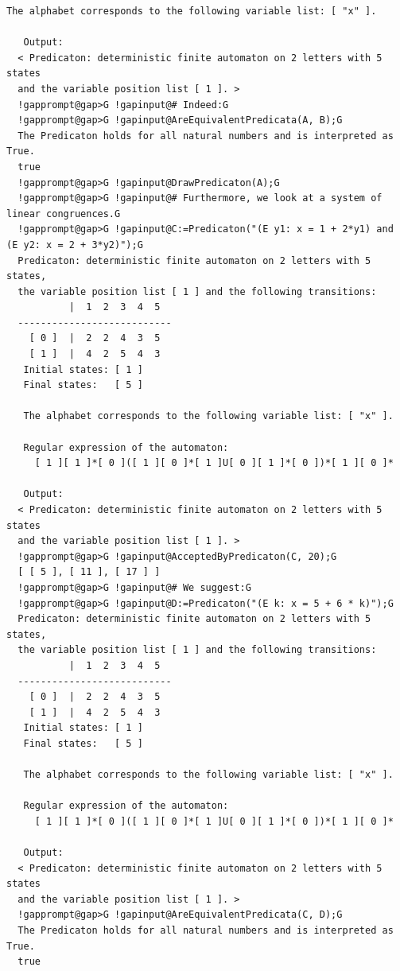 \documentclass[a4paper,11pt]{report}
\begin{document}
{{{\begin{Verbatim}[commandchars=!@G,fontsize=\small,frame=single,label=Example]
   The alphabet corresponds to the following variable list: [ "x" ].
  
   Output:
  < Predicaton: deterministic finite automaton on 2 letters with 5 states 
  and the variable position list [ 1 ]. >
  !gapprompt@gap>G !gapinput@# Indeed:G
  !gapprompt@gap>G !gapinput@AreEquivalentPredicata(A, B);G
  The Predicaton holds for all natural numbers and is interpreted as True.
  true
  !gapprompt@gap>G !gapinput@DrawPredicaton(A);G
  !gapprompt@gap>G !gapinput@# Furthermore, we look at a system of linear congruences.G
  !gapprompt@gap>G !gapinput@C:=Predicaton("(E y1: x = 1 + 2*y1) and (E y2: x = 2 + 3*y2)");G
  Predicaton: deterministic finite automaton on 2 letters with 5 states, 
  the variable position list [ 1 ] and the following transitions:
           |  1  2  3  4  5  
  ---------------------------
    [ 0 ]  |  2  2  4  3  5  
    [ 1 ]  |  4  2  5  4  3  
   Initial states: [ 1 ]
   Final states:   [ 5 ]
  
   The alphabet corresponds to the following variable list: [ "x" ].
  
   Regular expression of the automaton:
     [ 1 ][ 1 ]*[ 0 ]([ 1 ][ 0 ]*[ 1 ]U[ 0 ][ 1 ]*[ 0 ])*[ 1 ][ 0 ]*
  
   Output:
  < Predicaton: deterministic finite automaton on 2 letters with 5 states 
  and the variable position list [ 1 ]. >
  !gapprompt@gap>G !gapinput@AcceptedByPredicaton(C, 20);G
  [ [ 5 ], [ 11 ], [ 17 ] ]
  !gapprompt@gap>G !gapinput@# We suggest:G
  !gapprompt@gap>G !gapinput@D:=Predicaton("(E k: x = 5 + 6 * k)");G
  Predicaton: deterministic finite automaton on 2 letters with 5 states, 
  the variable position list [ 1 ] and the following transitions:
           |  1  2  3  4  5  
  ---------------------------
    [ 0 ]  |  2  2  4  3  5  
    [ 1 ]  |  4  2  5  4  3  
   Initial states: [ 1 ]
   Final states:   [ 5 ]
  
   The alphabet corresponds to the following variable list: [ "x" ].
  
   Regular expression of the automaton:
     [ 1 ][ 1 ]*[ 0 ]([ 1 ][ 0 ]*[ 1 ]U[ 0 ][ 1 ]*[ 0 ])*[ 1 ][ 0 ]*
  
   Output:
  < Predicaton: deterministic finite automaton on 2 letters with 5 states 
  and the variable position list [ 1 ]. >
  !gapprompt@gap>G !gapinput@AreEquivalentPredicata(C, D);G
  The Predicaton holds for all natural numbers and is interpreted as True.
  true
\end{Verbatim}
 
}}}
\end{document}
